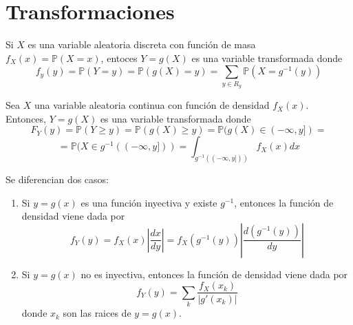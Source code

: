 \begin{ejr}

\end{ejr}

\section{Transformaciones}

\begin{defn}
Si $X$ es una variable aleatoria discreta con función de masa $f_X(x) = \mathbb{P}(X = x)$, entoces $Y = g(X)$ es una variable transformada donde \[ f_y(y) = \mathbb{P}(Y = y) = \mathbb{P}(g(X) = y) = \sum_{y\in R_y} \mathbb{P}(X = g^{-1}(y)) \] 
\end{defn}

\begin{defn}
Sea $X$ una variable aleatoria continua con función de densidad $f_X(x)$. Entonces, $Y=g(X)$ es una variable transformada donde \[ F_Y(y) = \mathbb{P}(Y\geq y) = \mathbb{P}(g(X)\geq y) = \mathbb{P}(g(X) \in (-\infty,y])= \] \[  = \mathbb{P}(X \in g^{-1}((-\infty,y])) = \int_{g^{-1}((-\infty,y]))} f_X(x)dx\]
\end{defn}

\begin{obs}
Se diferencian dos casos:
\begin{enumerate}[label=(\roman*)]
    \item Si $y = g(x)$ es una función inyectiva y existe $g^{-1}$, entonces la función de densidad viene dada por \[ f_Y(y) = f_X(x)\left|\frac{dx}{dy}\right| = f_X(g^{-1}(y))\left|\frac{d(g^{-1}(y))}{dy}\right| \]
    \item Si $y = g(x)$ no es inyectiva, entonces la función de densidad viene dada por \[ f_Y(y) = \sum_k \frac{f_X(x_k)}{|g'(x_k)|}\] donde $x_k$ son las raices de $y = g(x)$.
\end{enumerate}
\end{obs}

\begin{ejr}

\end{ejr}

\begin{ejr}

\end{ejr}


